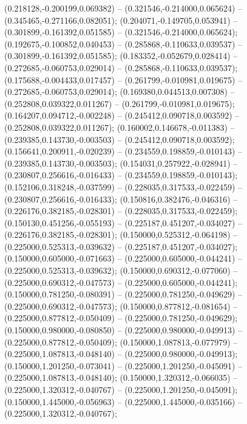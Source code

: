  (0.218128,-0.200199,0.069382) -- (0.321546,-0.214000,0.065624) -- (0.345465,-0.271166,0.082051);
 (0.204071,-0.149705,0.053941) -- (0.301899,-0.161392,0.051585) -- (0.321546,-0.214000,0.065624);
 (0.192675,-0.100852,0.040453) -- (0.285868,-0.110633,0.039537) -- (0.301899,-0.161392,0.051585);
 (0.183352,-0.052679,0.028414) -- (0.272685,-0.060753,0.029014) -- (0.285868,-0.110633,0.039537);
 (0.175688,-0.004433,0.017457) -- (0.261799,-0.010981,0.019675) -- (0.272685,-0.060753,0.029014);
 (0.169380,0.044513,0.007308) -- (0.252808,0.039322,0.011267) -- (0.261799,-0.010981,0.019675);
 (0.164207,0.094712,-0.002248) -- (0.245412,0.090718,0.003592) -- (0.252808,0.039322,0.011267);
 (0.160002,0.146678,-0.011383) -- (0.239385,0.143730,-0.003503) -- (0.245412,0.090718,0.003592);
 (0.156641,0.200911,-0.020239) -- (0.234559,0.198859,-0.010143) -- (0.239385,0.143730,-0.003503);
 (0.154031,0.257922,-0.028941) -- (0.230807,0.256616,-0.016433) -- (0.234559,0.198859,-0.010143);
 (0.152106,0.318248,-0.037599) -- (0.228035,0.317533,-0.022459) -- (0.230807,0.256616,-0.016433);
 (0.150816,0.382476,-0.046316) -- (0.226176,0.382185,-0.028301) -- (0.228035,0.317533,-0.022459);
 (0.150130,0.451256,-0.055193) -- (0.225187,0.451207,-0.034027) -- (0.226176,0.382185,-0.028301);
 (0.150000,0.525312,-0.064198) -- (0.225000,0.525313,-0.039632) -- (0.225187,0.451207,-0.034027);
 (0.150000,0.605000,-0.071663) -- (0.225000,0.605000,-0.044241) -- (0.225000,0.525313,-0.039632);
 (0.150000,0.690312,-0.077060) -- (0.225000,0.690312,-0.047573) -- (0.225000,0.605000,-0.044241);
 (0.150000,0.781250,-0.080391) -- (0.225000,0.781250,-0.049629) -- (0.225000,0.690312,-0.047573);
 (0.150000,0.877812,-0.081654) -- (0.225000,0.877812,-0.050409) -- (0.225000,0.781250,-0.049629);
 (0.150000,0.980000,-0.080850) -- (0.225000,0.980000,-0.049913) -- (0.225000,0.877812,-0.050409);
 (0.150000,1.087813,-0.077979) -- (0.225000,1.087813,-0.048140) -- (0.225000,0.980000,-0.049913);
 (0.150000,1.201250,-0.073041) -- (0.225000,1.201250,-0.045091) -- (0.225000,1.087813,-0.048140);
 (0.150000,1.320312,-0.066035) -- (0.225000,1.320312,-0.040767) -- (0.225000,1.201250,-0.045091);
 (0.150000,1.445000,-0.056963) -- (0.225000,1.445000,-0.035166) -- (0.225000,1.320312,-0.040767);
